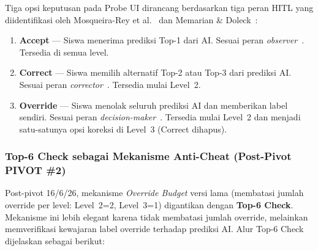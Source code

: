 \documentclass[12pt,a4paper,oneside,openany]{report}
\begin{document}
Tiga opsi keputusan pada Probe UI dirancang berdasarkan tiga peran HITL yang diidentifikasi oleh Mosqueira-Rey et al.~\cite{ref4} dan Memarian \& Doleck~\cite{ref5}:

\begin{enumerate}
    \item \textbf{Accept} --- Siswa menerima prediksi Top-1 dari AI. Sesuai peran \textit{observer}~\cite{ref4}. Tersedia di semua level.
    \item \textbf{Correct} --- Siswa memilih alternatif Top-2 atau Top-3 dari prediksi AI. Sesuai peran \textit{corrector}~\cite{ref4}\cite{ref5}. Tersedia mulai Level~2.
    \item \textbf{Override} --- Siswa menolak seluruh prediksi AI dan memberikan label sendiri. Sesuai peran \textit{decision-maker}~\cite{ref4}\cite{ref5}. Tersedia mulai Level~2 dan menjadi satu-satunya opsi koreksi di Level~3 (Correct dihapus).
\end{enumerate}

\subsubsection{Top-6 Check sebagai Mekanisme Anti-Cheat (Post-Pivot PIVOT \#2)}

Post-pivot 16/6/26, mekanisme \textit{Override Budget} versi lama (membatasi jumlah override per level: Level~2=2, Level~3=1) digantikan dengan \textbf{Top-6 Check}. Mekanisme ini lebih elegant karena tidak membatasi jumlah override, melainkan memverifikasi kewajaran label override terhadap prediksi AI. Alur Top-6 Check dijelaskan sebagai berikut:
\end{document}
